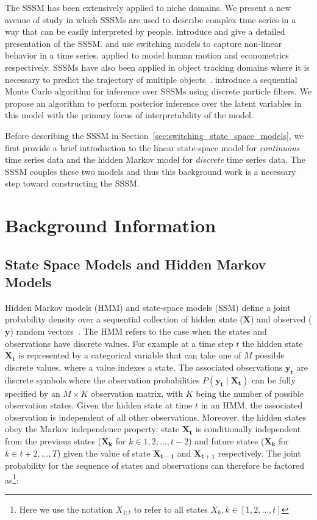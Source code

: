The SSSM has been extensively applied to niche domains. We present a new avenue of study in which SSSMs are used to describe complex time series in a way that can be easily interpreted by people. \citet{ghahramani2000variational} introduce and give a detailed presentation of the SSSM. \citet{pavlovic2001learning} and \citet{giordani2007unified} use switching models to capture non-linear behavior in a time series, applied to model human motion and econometrics respectively. SSSMs have also been applied in object tracking domains where it is necessary to predict the trajectory of multiple objects~\citep{fox2007hierarchical}. \citet{whiteley2010efficient} introduce a sequential Monte Carlo algorithm for inference over SSSMs using discrete particle filters. We propose an algorithm to perform posterior inference over the latent variables in this model with the primary focus of interpretability of the model.

Before describing the SSSM in Section~\ref{sec:switching_state_space_models}, we first provide a brief introduction to the linear state-space model for \textit{continuous} time series data and the hidden Markov model for \textit{discrete} time series data. The SSSM couples these two models and thus this background work is a necessary step toward constructing the SSSM.


\section{Background Information}
\subsection{State Space Models and Hidden Markov Models}\label{sec:state_space_and_hidden_markov_models}
Hidden Markov models (HMM) and state-space models (SSM) define a joint probability density over a sequential collection of hidden state ($\mathbf{X}$) and observed ($\mathbf{y}$) random vectors~\citep{ghahramani2001introduction,shumway2000time}. The HMM refers to the case when the states and observations have discrete values. For example at a time step $t$ the hidden state $\mathbf{X_t}$ is represented by a categorical variable that can take one of $M$ possible discrete values, where a value indexes a state. The associated observations $\mathbf{y_t}$ are discrete symbols where the observation probabilities $P(\mathbf{y_t} \mid \mathbf{X_t})$ can be fully specified by an $M \times K$ observation matrix, with $K$ being the number of possible observation states. Given the hidden state at time $t$ in an HMM, the associated observation is independent of all other observations. Moreover, the hidden states obey the Markov independence property: state $\mathbf{X_{t}}$ is conditionally independent from the previous states ($\mathbf{X_{k}}$ for $k \in 1,2, \hdots, t-2$) and future states ($\mathbf{X_{k}}$ for $k \in t+2, \hdots, T$) given the value of state $\mathbf{X_{t-1}}$ and $\mathbf{X_{t+1}}$ respectively. The joint probability for the sequence of states and observations can therefore be factored as\footnote{Here we use the notation $X_{1:t}$ to refer to all states $X_k, k \in [1,2,\hdots,t]$}:

